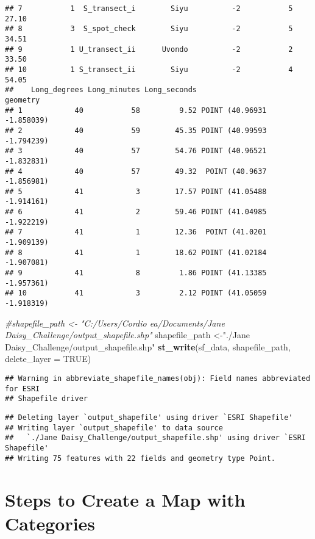 \documentclass[
]{article}
\newenvironment{Shaded}{\begin{snugshade}}{\end{snugshade}}
\newcommand{\AttributeTok}[1]{\textcolor[rgb]{0.13,0.29,0.53}{#1}}
\newcommand{\CommentTok}[1]{\textcolor[rgb]{0.56,0.35,0.01}{\textit{#1}}}
\newcommand{\ConstantTok}[1]{\textcolor[rgb]{0.56,0.35,0.01}{#1}}
\newcommand{\FunctionTok}[1]{\textcolor[rgb]{0.13,0.29,0.53}{\textbf{#1}}}
\newcommand{\NormalTok}[1]{#1}
\newcommand{\OtherTok}[1]{\textcolor[rgb]{0.56,0.35,0.01}{#1}}
\newcommand{\StringTok}[1]{\textcolor[rgb]{0.31,0.60,0.02}{#1}}
\begin{document}
\begin{verbatim}
## 7           1  S_transect_i        Siyu          -2           5       27.10
## 8           3  S_spot_check        Siyu          -2           5       34.51
## 9           1 U_transect_ii      Uvondo          -2           2       33.50
## 10          1 S_transect_ii        Siyu          -2           4       54.05
##    Long_degrees Long_minutes Long_seconds                   geometry
## 1            40           58         9.52 POINT (40.96931 -1.858039)
## 2            40           59        45.35 POINT (40.99593 -1.794239)
## 3            40           57        54.76 POINT (40.96521 -1.832831)
## 4            40           57        49.32  POINT (40.9637 -1.856981)
## 5            41            3        17.57 POINT (41.05488 -1.914161)
## 6            41            2        59.46 POINT (41.04985 -1.922219)
## 7            41            1        12.36  POINT (41.0201 -1.909139)
## 8            41            1        18.62 POINT (41.02184 -1.907081)
## 9            41            8         1.86 POINT (41.13385 -1.957361)
## 10           41            3         2.12 POINT (41.05059 -1.918319)
\end{verbatim}

\begin{Shaded}
\begin{Highlighting}[]
\CommentTok{\#shapefile\_path \textless{}{-} "C:/Users/Cordio ea/Documents/Jane Daisy\_Challenge/output\_shapefile.shp"}
\NormalTok{shapefile\_path }\OtherTok{\textless{}{-}}\StringTok{"./Jane Daisy\_Challenge/output\_shapefile.shp"}
\FunctionTok{st\_write}\NormalTok{(sf\_data, shapefile\_path, }\AttributeTok{delete\_layer =} \ConstantTok{TRUE}\NormalTok{)}
\end{Highlighting}
\end{Shaded}

\begin{verbatim}
## Warning in abbreviate_shapefile_names(obj): Field names abbreviated for ESRI
## Shapefile driver
\end{verbatim}

\begin{verbatim}
## Deleting layer `output_shapefile' using driver `ESRI Shapefile'
## Writing layer `output_shapefile' to data source 
##   `./Jane Daisy_Challenge/output_shapefile.shp' using driver `ESRI Shapefile'
## Writing 75 features with 22 fields and geometry type Point.
\end{verbatim}

\section{Steps to Create a Map with
Categories}\label{steps-to-create-a-map-with-categories}
\end{document}

